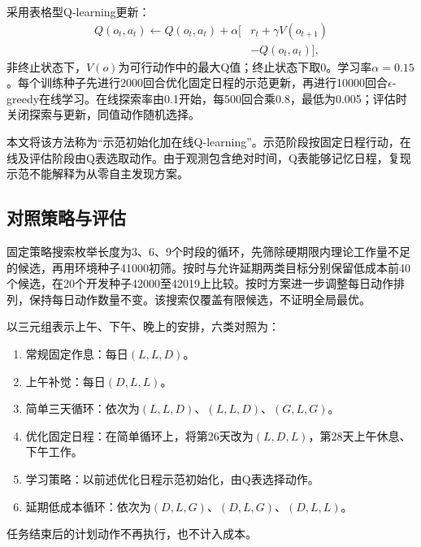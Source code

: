 \documentclass[journal]{IEEEtran}
\begin{document}
采用表格型Q-learning更新\cite{watkins1992}：
\begin{equation}
\begin{split}
Q(o_t,a_t)\leftarrow Q(o_t,a_t)+\alpha\big[
&r_t+\gamma V(o_{t+1})\\
&-Q(o_t,a_t)\big],
\end{split}
\end{equation}
非终止状态下，$V(o)$为可行动作中的最大Q值；终止状态下取0。学习率$\alpha=0.15$。每个训练种子先进行2000回合优化固定日程的示范更新，再进行10000回合$\epsilon$-greedy在线学习。在线探索率由0.1开始，每500回合乘0.8，最低为0.005；评估时关闭探索与更新，同值动作随机选择。

本文将该方法称为“示范初始化加在线Q-learning”。示范阶段按固定日程行动，在线及评估阶段由Q表选取动作。由于观测包含绝对时间，Q表能够记忆日程，复现示范不能解释为从零自主发现方案。

\subsection{对照策略与评估}

固定策略搜索枚举长度为3、6、9个时段的循环，先筛除硬期限内理论工作量不足的候选，再用环境种子41000初筛。按时与允许延期两类目标分别保留低成本前40个候选，在20个开发种子42000至42019上比较。按时方案进一步调整每日动作排列，保持每日动作数量不变。该搜索仅覆盖有限候选，不证明全局最优。

以三元组表示上午、下午、晚上的安排，六类对照为：
\begin{enumerate}
    \item 常规固定作息：每日$(L,L,D)$。
    \item 上午补觉：每日$(D,L,L)$。
    \item 简单三天循环：依次为$(L,L,D)$、$(L,L,D)$、$(G,L,G)$。
    \item 优化固定日程：在简单循环上，将第26天改为$(L,D,L)$，第28天上午休息、下午工作。
    \item 学习策略：以前述优化日程示范初始化，由Q表选择动作。
    \item 延期低成本循环：依次为$(D,L,G)$、$(D,L,G)$、$(D,L,L)$。
\end{enumerate}
任务结束后的计划动作不再执行，也不计入成本。
\end{document}
